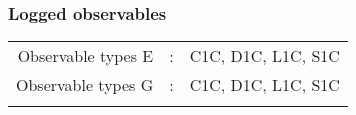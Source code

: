 %
\subsubsection{Logged observables}%
\label{ssubsec:Loggedobservables}%
\setlength{\tabcolsep}{4pt}%
\begin{longtabu}[l]{rcl}%
Observable types E&:&C1C, D1C, L1C, S1C\\%
Observable types G&:&C1C, D1C, L1C, S1C\\%
&&\\%
\end{longtabu}

